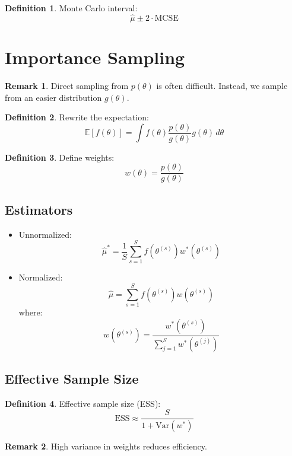 \documentclass[12pt,oneside]{book}
\numberwithin{equation}{section}
\theoremstyle{definition}
\newtheorem{definition}{Definition}[section]
\newtheorem{remark}{Remark}[section]
\theoremstyle{plain}
\theoremstyle{remark}
\newcommand{\E}{\mathbb{E}}
\newcommand{\Var}{\mathrm{Var}}
\begin{document}
\begin{definition}
Monte Carlo interval:
$$
\hat{\mu} \pm 2 \cdot \text{MCSE}
$$
\end{definition}

\section{Importance Sampling}

\begin{remark}
Direct sampling from $p(\theta)$ is often difficult. Instead, we sample from an easier distribution $g(\theta)$.
\end{remark}

\begin{definition}
Rewrite the expectation:
$$
\E[f(\theta)]
=
\int f(\theta)\frac{p(\theta)}{g(\theta)}g(\theta)\,d\theta
$$
\end{definition}

\begin{definition}
Define weights:
$$
w(\theta) = \frac{p(\theta)}{g(\theta)}
$$
\end{definition}

\subsection{Estimators}

\begin{itemize}
\item Unnormalized:
$$
\hat{\mu}^* = \frac{1}{S}\sum_{s=1}^S f(\theta^{(s)})w^*(\theta^{(s)})
$$

\item Normalized:
$$
\hat{\mu} =
\sum_{s=1}^S f(\theta^{(s)})w(\theta^{(s)})
$$
where:
$$
w(\theta^{(s)}) = \frac{w^*(\theta^{(s)})}{\sum_{j=1}^S w^*(\theta^{(j)})}
$$
\end{itemize}

\subsection{Effective Sample Size}

\begin{definition}
Effective sample size (ESS):
$$
\text{ESS} \approx \frac{S}{1 + \Var(w^*)}
$$
\end{definition}

\begin{remark}
High variance in weights reduces efficiency.
\end{remark}
\end{document}
